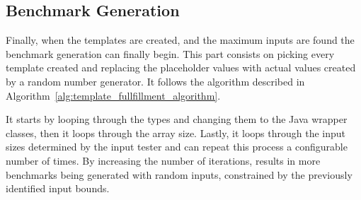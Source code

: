 \subsection{Benchmark Generation} \label{sec:work_stage1_program_generation}

Finally, when the templates are created, and the maximum inputs are found the benchmark generation can finally begin. This part consists on picking every template created and replacing the placeholder values with actual values created by a random number generator. It follows the algorithm described in Algorithm~\ref{alg:template_fullfillment_algorithm}.

It starts by looping through the types and changing them to the Java wrapper classes, then it loops through the array size. Lastly, it loops through the input sizes determined by the input tester and can repeat this process a configurable number of times. By increasing the number of iterations, results in more benchmarks being generated with random inputs, constrained by the previously identified input bounds. 




